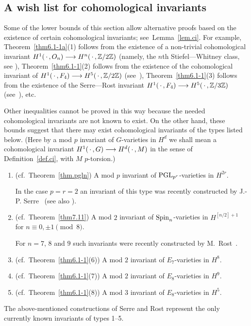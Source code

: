 \subsection*{A wish list for cohomological invariants}

\begin{remark} \label{rem.ci2} 
Some of the lower bounds of this section allow alternative proofs based
on the existence of certain cohomological invariants; see~Lemma~\ref{lem.ci}. 
For example, Theorem~\ref{thm6.1-1a}(1) follows from the existence
of a non-trivial cohomological invariant $H^1(\, \cdot \,, O_n)
\longrightarrow H^n(\, \cdot \,, {\Bbb Z}/2{\Bbb Z})$ (namely, the $n$th Stiefel---Whitney 
class, see \cite[Section 6.3]{serrepp}),
Theorem~\ref{thm6.1-1}(2) follows from the existence
of the cohomological invariant of $H^1(\, \cdot \,, F_4) \longrightarrow
H^5(\, \cdot \,, {\Bbb Z}/2{\Bbb Z})$ (see~\cite[Section 9.2]{serrepp}), 
Theorem~\ref{thm6.1-1}(3) follows from
the existence of the Serre---Rost invariant  $H^1(\, \cdot \,, F_4) \longrightarrow
H^5(\, \cdot \,, {\Bbb Z}/3{\Bbb Z})$ (see~\cite[Section 9.3]{serrepp}), etc.

Other inequalities cannot be proved in this way because the needed
cohomological invariants are not known to exist. On the other 
hand, these bounds suggest that there may exist cohomological invariants 
of the types listed below.
(Here by a mod $p$ invariant of $G$-varieties in $H^d$ 
we shall mean a cohomological invariant 
$H^1(\, \cdot \,, G) \longrightarrow H^d (\, \cdot \, , M)$ in the sense of 
Definition~\ref{def.ci}, with $M$ $p$-torsion.) 

\begin{enumerate}
\item (cf.\ Theorem~\ref{thm.pgln})
A mod $p$ invariant of $\operatorname{PGL}_{p^r}$-varieties in $H^{2r}$.

In the case $p=r=2$ an invariant of this type was recently constructed
by J.-P. Serre~\cite{serrepc2} (see also \cite{rostprep}). 

\item (cf.\ Theorem~\ref{thm7.11})
A mod $2$ invariant of $\operatorname{Spin}_n$-varieties in $H^{[n/2]+1}$ for
$n \equiv  0, \pm 1 \pmod 8$.

For $n = 7$, $8$ and $9$ such invariants were recently constructed
by M.~Rost~\cite{rostspin}. 

\item (cf.\ Theorem~\ref{thm6.1-1}(6))
A mod $2$ invariant of $E_7$-varieties in $H^8$.

\item (cf.\ Theorem~\ref{thm6.1-1}(7))
A mod $2$ invariant of $E_8$-varieties in $H^9$.

\item (cf.\ Theorem~\ref{thm6.1-1}(8))
A mod $3$ invariant of $E_8$-varieties in $H^5$.
\end{enumerate}

\smallskip
The above-mentioned constructions of Serre and Rost 
represent the only currently known invariants of types 1--5.
\end{remark}

